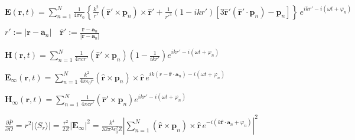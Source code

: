 \documentclass[multi={mymath},border=1pt,convert={density=300,outext=.png}]{standalone}
\newenvironment{mymath}{$\displaystyle}{$}
\begin{document}
\pagecolor[RGB]{255,255,255} %

\newcommand{\norm}[1]{\left|#1\right|}

\begin{mymath}
\mathbf{E}(\mathbf{r}, t) = \sum_{n=1}^{N}\frac{1}{4\pi\epsilon_{0}}\left\{ \frac{k^{2}}{r'}(\mathbf{\hat{r}'} \times \mathbf{p}_{n}) \times \mathbf{\hat{r}'} + \frac{1}{r'^{3}}(1-ikr')\left[3\mathbf{\hat{r}'}(\mathbf{\hat{r}'}\cdot\mathbf{p}_{n}) - \mathbf{p}_{n}\right]\right\}\,e^{ikr' - i(\omega t + \varphi_{n})}
\end{mymath}

\begin{mymath}
r' := |\mathbf{r} - \mathbf{a}_{n}|\quad\mathbf{\hat{r}'} := \frac{\mathbf{r} - \mathbf{a}_{n}}{|\mathbf{r} - \mathbf{a}_{n}|}
\end{mymath}

\begin{mymath}
\mathbf{H}(\mathbf{r}, t) = \sum_{n=1}^{N}\frac{1}{4\pi c r'} (\mathbf{\hat{r}'} \times \mathbf{p}_{n}) \left (1 - \frac{1}{ikr'}\right) e^{ikr' - i(\omega t + \varphi_{n})}
\end{mymath}


\begin{mymath}
\mathbf{E}_{\infty}(\mathbf{r}, t) = \sum_{n=1}^{N}\frac{k^{2}}{4\pi\epsilon_{0}r} (\mathbf{\hat{r}} \times \mathbf{p}_{n}) \times \mathbf{\hat{r}}\,e^{ik(r - \mathbf{\hat{r}}\cdot\mathbf{a}_{n}) - i(\omega t + \varphi_{n})}
\end{mymath}

\begin{mymath}
\mathbf{H}_\infty(\mathbf{r}, t) = \sum_{n=1}^{N}\frac{1}{4\pi c r'} (\mathbf{\hat{r}'} \times \mathbf{p}_{n}) e^{ikr' - i(\omega t + \varphi_{n})}
\end{mymath}


\begin{mymath}
  \frac{\partial \overline{P}}{\partial \Omega} = r^{2} |\langle S_{r} \rangle| = \frac{r^{2}}{2Z} \norm{\mathbf{E}_{\infty}}^{2} = \frac{k^{4}}{32\pi^{2}\epsilon_{0}^{2}Z} \norm{\sum_{n=1}^{N} (\mathbf{\hat{r}} \times \mathbf{p}_{n}) \times \mathbf{\hat{r}}\, e^{- i(k\mathbf{\hat{r}}\cdot\mathbf{a}_{n} + \varphi_{n})}}^{2}
\end{mymath}
\end{document}
